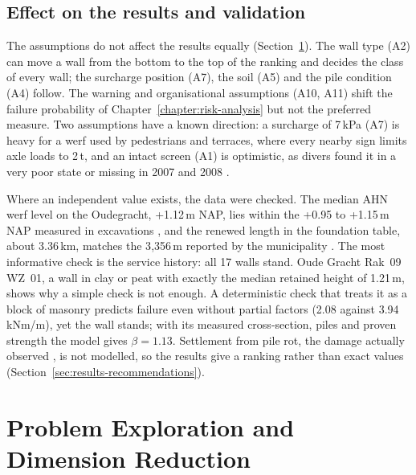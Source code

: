 \subsection{Effect on the results and validation}\label{sec:data-effect}

The assumptions do not affect the results equally
(Section~\ref{sec:dimension-reduction}). The wall type (A2) can move a wall
from the bottom to the top of the ranking and decides the class of every wall;
the surcharge position (A7), the soil (A5) and the pile condition (A4) follow.
The warning and organisational assumptions (A10, A11) shift the failure
probability of Chapter~\ref{chapter:risk-analysis} but not the preferred
measure. Two assumptions have a known direction: a surcharge of 7\,kPa (A7) is heavy for a werf used by
pedestrians and terraces, where every nearby sign limits axle loads to 2\,t,
and an intact screen (A1) is optimistic, as divers found it in a very poor
state or missing in 2007 and 2008 \parencite{ibu2010}.

Where an independent value exists, the data were checked. The median AHN werf
level on the Oudegracht, +1.12\,m NAP, lies within the
+0.95 to +1.15\,m NAP measured in excavations \parencite{erfgoed156,erfgoed158},
and the renewed length in the foundation table, about 3.36\,km, matches the
3{,}356\,m reported by the municipality \parencite{gu2025up}. The most
informative check is the service history: all 17 walls stand. Oude Gracht Rak~09 WZ~01, a wall in clay
or peat with exactly the median retained height of 1.21\,m, shows why a simple check is not enough. A
deterministic check that treats it as a block of masonry predicts failure even
without partial factors (2.08 against 3.94\,kNm/m), yet the wall stands; with
its measured cross-section, piles and proven strength the model gives
$\beta = 1.13$. Settlement
from pile rot, the damage actually observed \parencite{erfgoed156}, is not
modelled, so the results give a ranking rather than exact values
(Section~\ref{sec:results-recommendations}).

\clearpage
\section{Problem Exploration and Dimension Reduction}
\label{sec:dimension-reduction}


